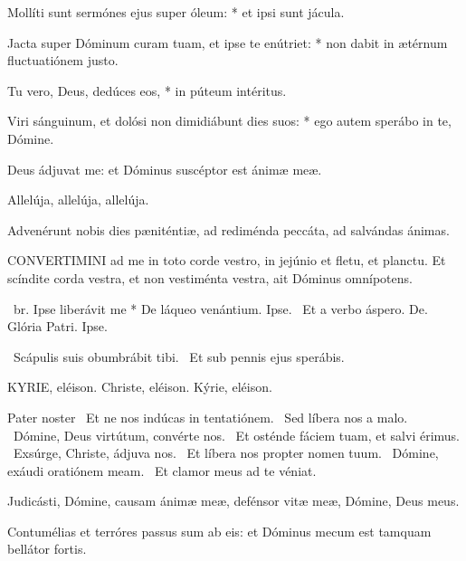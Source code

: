 Mollíti sunt sermónes ejus super óleum: * et ipsi sunt jácula.

Jacta super Dóminum curam tuam, et ipse te enútriet: * non dabit in ætérnum fluctuatiónem justo.

Tu vero, Deus, dedúces eos, * in púteum intéritus.

Viri sánguinum, et dolósi non dimidiábunt dies suos: * ego autem sperábo in te, Dómine.

  Deus ádjuvat me: et Dóminus suscéptor est ánimæ meæ.

  Allelúja, allelúja, allelúja.



 Advenérunt nobis dies pæniténtiæ, ad rediménda peccáta, ad salvándas ánimas.


\lettrine[lines=2]{C}{ONVERTIMINI} ad me in toto corde vestro, in jejúnio et fletu, et planctu. Et scíndite corda vestra, et non vestiménta vestra, ait Dóminus omnípotens.

\R\ br. Ipse liberávit me * De láqueo venántium. Ipse. \V\ Et a verbo áspero. De. Glória Patri. Ipse.

\V\ Scápulis suis obumbrábit tibi. \R\ Et sub pennis ejus sperábis.


KYRIE, eléison. Christe, eléison. Kýrie, eléison.

Pater noster  \V\ Et ne nos indúcas in tentatiónem. \R\ Sed líbera nos a malo. \V\ Dómine, Deus virtútum, convérte nos. \R\ Et osténde fáciem tuam, et salvi érimus. \V\ Exsúrge, Christe, ádjuva nos. \R\ Et líbera nos propter nomen tuum. \V\ Dómine, exáudi oratiónem meam. \R\ Et clamor meus ad te véniat.



 Judicásti, Dómine, causam ánimæ meæ, defénsor vitæ meæ, Dómine, Deus meus.


 Contumélias et terróres passus sum ab eis: et Dóminus mecum est tamquam bellátor fortis.

